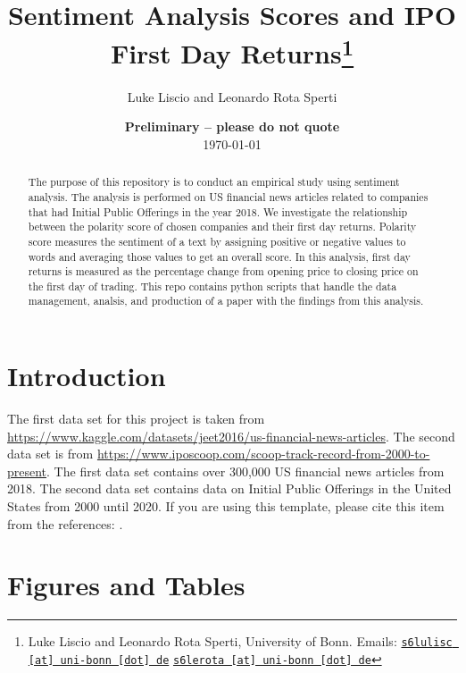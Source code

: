 \documentclass[11pt, a4paper, leqno]{article}
\begin{document}
\title{Sentiment Analysis Scores and IPO First Day Returns\thanks{Luke Liscio and Leonardo Rota Sperti, University of Bonn. Emails: \href{mailto:s6lulisc@uni-bonn.de}{\nolinkurl{s6lulisc [at] uni-bonn [dot] de}} \href{mailto:s6lerota@uni-bonn.de}{\nolinkurl{s6lerota [at] uni-bonn [dot] de}}}}

\author{Luke Liscio and Leonardo Rota Sperti}

\date{
    {\bf Preliminary -- please do not quote}
    \\[1ex]
    \today
}

\maketitle


\begin{abstract}
    The purpose of this repository is to conduct an empirical study using sentiment analysis.
The analysis is performed on US financial news articles related to companies that had Initial Public Offerings in the year 2018.
We investigate the relationship between the polarity score of chosen companies and their first day returns.
Polarity score measures the sentiment of a text by assigning positive or negative values to words and averaging those values to get an overall score.
In this analysis, first day returns is measured as the percentage change from opening price to closing price on the first day of trading.
This repo contains python scripts that handle the data management, analsis, and production of a paper with the findings from this analysis.
\end{abstract}

\clearpage


\section{Introduction} %
\label{sec:introduction}

The first data set for this project is taken from
\url{https://www.kaggle.com/datasets/jeet2016/us-financial-news-articles}.
The second data set is from
\url{https://www.iposcoop.com/scoop-track-record-from-2000-to-present}.
The first data set contains over 300,000 US financial news articles from 2018.
The second data set contains data on Initial Public Offerings in the United States from 2000 until 2020.
If you are using this template, please cite this item from the references:
\citet{GaudeckerEconProjectTemplates}.

\section{Figures and Tables}
\label{sec:Figures and Tables}
\end{document}
